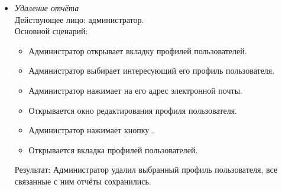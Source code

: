 \begin{itemize}[topsep=0pt, parsep=0pt, itemsep=0pt, leftmargin=*, labelindent=0.5cm]
	\item \textit{Удаление отчёта} \\
	Действующее лицо: администратор. \\
	Основной сценарий:
	\begin{itemize}[topsep=0pt, parsep=0pt, itemsep=0pt, leftmargin=*, labelindent=0.5cm]
		\item Администратор открывает вкладку профилей пользователей.
		\item Администратор выбирает интересующий его профиль пользователя.
		\item Администратор нажимает на его адрес электронной почты.
		\item Открывается окно редактирования профиля пользователя.
		\item Администратор нажимает кнопку .
		\item Открывается вкладка профилей пользователей.
	\end{itemize}
	Результат: Администратор удалил выбранный профиль пользователя, все связанные с ним отчёты сохранились.
\end{itemize}
